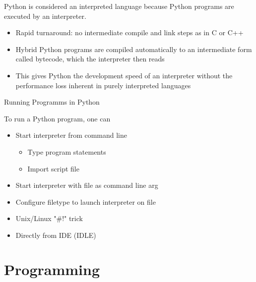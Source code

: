 \documentclass{beamer}
\begin{document}
\begin{frame}
Python is considered an \alert{interpreted language} because Python programs
are executed by an interpreter.
\begin{itemize}
\item Rapid turnaround: no intermediate compile and link steps as in C or C++
\item Hybrid Python programs are compiled automatically to an intermediate form called \alert{bytecode}, which the interpreter then reads
\item This gives Python the development speed of an interpreter without the performance loss inherent in purely interpreted languages
\end{itemize}
\end{frame}

\begin{frame}{Running Programms in Python}

To run a Python program, one can
\begin{itemize}
\item Start interpreter from command line 
\begin{itemize}
\item Type program statements
\item Import script file
\end{itemize}
\item Start interpreter with file as command line arg 
\item Configure filetype to launch interpreter on file
\item Unix/Linux "\#!" trick 
\item \alert{Directly from IDE (IDLE)}
\end{itemize}
\end{frame}
\section{Programming}
\end{document}
